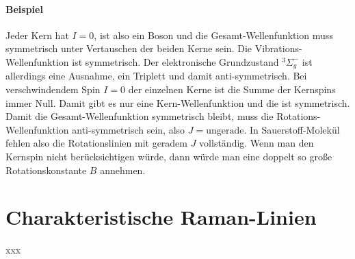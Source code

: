 \paragraph{Beispiel } Jeder Kern hat $I = 0$, ist also ein Boson und die Gesamt-Wellenfunktion muss symmetrisch unter Vertauschen der beiden Kerne sein. Die Vibrations-Wellenfunktion ist symmetrisch. Der elektronische Grundzustand $^3\Sigma_g^-$ ist allerdings eine Ausnahme, ein Triplett und damit anti-symmetrisch. Bei verschwindendem Spin $I=0$  der einzelnen Kerne ist die Summe der Kernspins immer Null. Damit gibt es nur eine Kern-Wellenfunktion und die ist symmetrisch. Damit die Gesamt-Wellenfunktion symmetrisch bleibt, muss die Rotations-Wellenfunktion anti-symmetrisch sein, also $J = \text{ungerade}$. In Sauerstoff-Molekül   fehlen also die Rotationslinien mit geradem $J$ vollständig. Wenn man den Kernspin nicht berücksichtigen würde, dann würde man eine doppelt so große Rotationskonstante $B$ annehmen.


\section{Charakteristische Raman-Linien}

xxx


\printbibliography[segment=\therefsegment,heading=subbibliography]
